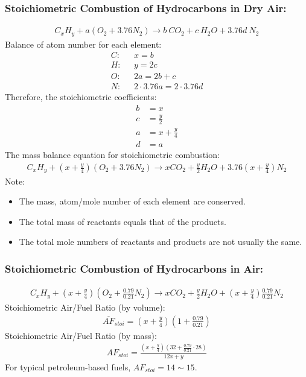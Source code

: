 \documentclass[class=report, crop=false, 12pt,a4paper]{standalone}
\numberwithin{equation}{section}
\begin{document}
\subsubsection{Stoichiometric Combustion of Hydrocarbons in Dry Air:}
\begin{gather}
  C_xH_y + a(O_2 + 3.76N_2) \longrightarrow b\ CO_2 + c\ H_2O + 3.76d\ N_2
\end{gather}
Balance of atom number for each element:
\begin{align}
  C: \ \ \ &x = b \\[5pt]
  H: \ \ \ &y = 2c \\[5pt]
  O: \ \ \ &2a = 2b + c \\[5pt]
  N: \ \ \ &2\cdot 3.76a = 2\cdot 3.76d
\end{align}
Therefore, the stoichiometric coefficients:
\begin{align}
  b &= x \\[5pt]
  c &= \frac{y}{2} \\[5pt]
  a &= x + \frac{y}{4} \\[5pt]
  d &= a
\end{align}
The mass balance equation for stoichiometric combustion:
\begin{gather}
  C_xH_y + \left(x+\frac{y}{4}\right)(O_2 + 3.76N_2) \longrightarrow xCO_2 + \frac{y}{2}H_2O + 3.76\left(x+\frac{y}{4}\right)N_2
\end{gather}
Note:
\begin{itemize}[noitemsep]
  \item The mass, atom/mole number of each element are conserved.
  \item The total mass of reactants equals that of the products.
  \item The total mole numbers of reactants and products are not usually the same.
\end{itemize}
\subsubsection{Stoichiometric Combustion of Hydrocarbons in Air:}
\begin{gather}
  C_xH_y + \left(x+\frac{y}{4}\right) \left(O_2 + \frac{0.79}{0.21}N_2\right) \longrightarrow xCO_2 + \frac{y}{2}H_2O + \left(x+\frac{y}{4}\right)\frac{0.79}{0.21}N_2
\end{gather}
Stoichiometric Air/Fuel Ratio (by volume):
\begin{gather}
  \overline{AF}_{stoi} = \left(x+\frac{y}{4}\right)\left(1+\frac{0.79}{0.21}\right)
\end{gather}
Stoichiometric Air/Fuel Ratio (by mass):
\begin{gather}
  AF_{stoi} = \frac{\left(x+\frac{y}{4}\right) \left(32+\frac{0.79}{0.21}\cdot 28\right)}{12x + y}
\end{gather}
For typical petroleum-based fuels, $AF_{stoi} = 14 \sim 15$.
\end{document}
